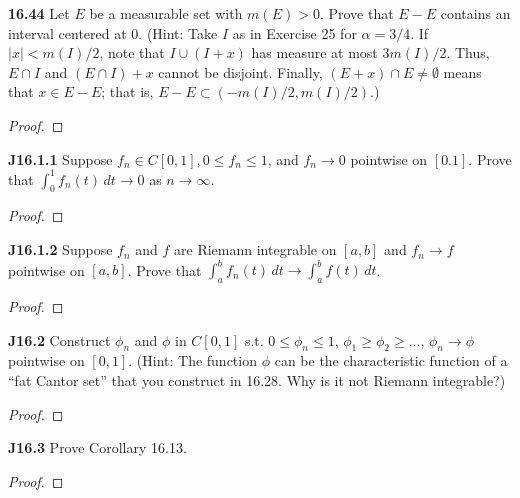 \documentclass{article}
\newcommand{\p}{\textbf}
\begin{document}
\p{16.44} Let $E$ be a measurable set with $m(E) > 0$. Prove that $E-E$ contains an interval centered at 0. (Hint: Take $I$ as in Exercise 25 for $\alpha = 3/4$. If $|x| < m(I)/2$, note that $I \cup (I + x)$ has measure at most $3m(I)/2$. Thus, $E \cap I $ and $(E \cap I) + x$ cannot be disjoint. Finally, $(E+x) \cap E \neq \emptyset$ means that $x \in E - E$; that is, $E - E \subset (-m(I)/2, m(I)/2)$.)
\begin{proof}
\end{proof}

\p{J16.1.1} Suppose $f_n \in C[0,1], 0 \leq f_n \leq 1$, and $f_n \rightarrow 0$ pointwise on $[0.1]$. Prove that $\int_0^1 f_n(t)\,dt \rightarrow 0$ as $n \rightarrow \infty$.
\begin{proof}
\end{proof}

\p{J16.1.2} Suppose $f_n$ and $f$ are Riemann integrable on $[a,b]$ and $f_n \rightarrow f$ pointwise on $[a,b]$. Prove that $\int_a^b f_n(t) \, dt \rightarrow \int_a^b f(t)\, dt$.
\begin{proof}
\end{proof}

\p{J16.2} Construct $\phi_n$ and $\phi$ in $C[0,1]$ s.t. $0\leq \phi_n \leq 1$, $\phi_1 \geq \phi_2 \geq \ldots$, $\phi_n \rightarrow \phi$ pointwise on $[0,1]$. (Hint: The function $\phi$ can be the characteristic function of a ``fat Cantor set'' that you construct in 16.28. Why is it not Riemann integrable?)
\begin{proof}
\end{proof}

\p{J16.3} Prove Corollary 16.13.
\begin{proof}
\end{proof}
\end{document}
